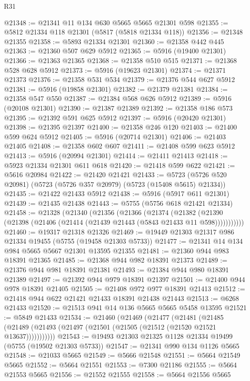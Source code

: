 \begin{lexlean}{R31}
\begin{coremodule}
@21348 := @21341 @11 @134 @630 @5665 @5665 @21301 @598
@21355 := @5812 @21334 @118 @21301 (@5817 (@5818 @21334 @118))
@21356 := @21348 @21355
@21358 := @5893 @21334 @21301
@21360 := @21358 @442 @445
@21363 := @21360 @507 @629 @5912
@21365 := @5916 (@19400 @21301)
@21366 := @21363 @21365
@21368 := @21358 @510 @515
@21371 := @21368 @528 @628 @5912
@21373 := @5916 (@19623 @21301)
@21374 := @21371 @21373
@21376 := @21358 @531 @534
@21379 := @21376 @544 @627 @5912
@21381 := @5916 (@19858 @21301)
@21382 := @21379 @21381
@21384 := @21358 @547 @550
@21387 := @21384 @568 @626 @5912
@21389 := @5916 (@20108 @21301)
@21390 := @21387 @21389
@21392 := @21358 @186 @573
@21395 := @21392 @591 @625 @5912
@21397 := @5916 (@20420 @21301)
@21398 := @21395 @21397
@21400 := @21358 @246 @120
@21403 := @21400 @599 @624 @5912
@21405 := @5916 (@20714 @21301)
@21406 := @21403 @21405
@21408 := @21358 @602 @607
@21411 := @21408 @599 @623 @5912
@21413 := @5916 (@20994 @21301)
@21414 := @21411 @21413
@21418 := @5923 @21334 @21301 @611 @618
@21420 := @21418 @599 @622
@21421 := @5616 @20984
@21422 := @21420 @21421
@21433 := @5723 (@5726 @520 @20981) (@5723 (@5726 @357 @20979) (@5723 (@15408 @5615) @21334))
@21435 := @21422 @21433 @5912
@21438 := @5916 (@5917 @611 @21301)
@21439 := @21435 @21438
@21443 := @5755 (@5756 @618 @21421 @21334)
@21458 := @21328
    (@21340
      (@21356
        (@21366
          (@21374
            (@21382 (@21390 (@21398 (@21406 (@21414 (@21439 @21443 (@5843 @21433 @11 @598)))))))))))
@21460 := @19317 @21318 @21326
@21469 := @19449 @21303 @21317 @986 @21334 @19455 (@5755 (@19458 @21303 @5733))
@21477 := @21341 @14 @134 @984 @5665 @5667 @21301 @13595 @21355
@21481 := @21360 @944 @983 @18391 @21365
@21485 := @21368 @944 @982 @18391 @21373
@21489 := @21376 @944 @981 @18391 @21381
@21493 := @21384 @944 @980 @18391 @21389
@21497 := @21392 @944 @979 @18391 @21397
@21501 := @21400 @944 @978 @18391 @21405
@21505 := @21408 @972 @977 @18391 @21413
@21512 := @21418 @944 @622 @21421 @21433 @18391 @21438 @21443
@21513 := @6268 @21433
@21520 := @21513 @941 @14 @136 @5665 @5665 @5458 @13595
@21521 := @5849 @21433
@21534 := @21460
    (@21469
      (@21477
        (@21481
          (@21485 (@21489 (@21493 (@21497 (@21501 (@21505 (@21512 (@21520 @21521 @13637)))))))))))
@21543 := @19493 @21303 @21325 @1128 @21334 @19499 (@5755 (@19502 @21303 @5733))
@21547 := @21341 @990 @134 @1126 @5665
@21548 := @21033 @5665
@21549 := @5666 @21548
@21551 := @5664 @21549 @5665
@21552 := @5664 @21551
@21553 := @7300 @21186
@21555 := @5664 @21553 @5665
@21556 := @21552 @21555
@21558 := @5664 @21556 @5665

\end{coremodule}
\end{lexlean}
